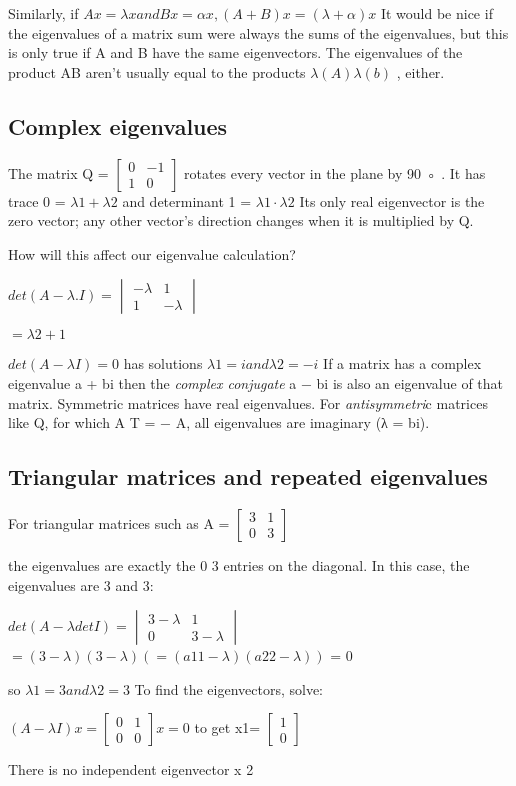 \documentclass{book}
\begin{document}
Similarly, if
$ Ax = \lambda x and Bx = αx, ( A + B ) x = ( \lambda + α ) x  $
It would be nice if the eigenvalues of a matrix sum were always the sums of the eigenvalues, but this is only true if A and B have the same eigenvectors. The eigenvalues of the product AB aren’t usually equal to the products
$ \lambda ( A ) \lambda ( b ) $ , either.

\subsection*{Complex eigenvalues}
The matrix Q =
$\begin{bmatrix} 
  0 & -1\\                
  1 & 0                 
 \end{bmatrix}$            
rotates every vector in the plane by 90 ◦ . It has trace 0 =
$ \lambda 1 + \lambda 2 $
and determinant 1 = 
$ \lambda 1 · \lambda 2 $
Its only real eigenvector is the zero vector; any other vector’s direction changes when it is multiplied by Q.

How will this affect our eigenvalue calculation?

$ det ( A − \lambda . I ) =
  \begin{vmatrix}
   − \lambda & 1\\
          1  & − \lambda
  \end{vmatrix}$

$ = \lambda 2 + 1 $

$ det ( A − λI ) = 0 $ 
has solutions 
$ λ 1 = i and λ 2 = − i $ 
If a matrix has a complex eigenvalue a + bi then the \emph{complex conjugate} a − bi is also an eigenvalue of that matrix.
Symmetric matrices have real eigenvalues.
For \emph{antisymmetri}c matrices like Q, for which A T = − A, all eigenvalues are imaginary (λ = bi).

\subsection*{Triangular matrices and repeated eigenvalues}

 For triangular matrices such as A = 
$\begin{bmatrix}
   3  & 1 \\
   0 & 3
  \end{bmatrix}$

the eigenvalues are exactly the 0 3  entries on the diagonal. In this case, the eigenvalues are 3 and 3:

$ det ( A − λ det I )=
\begin{vmatrix}
 3-\lambda & 1\\
   0       & 3-\lambda
\end{vmatrix}$
$ = ( 3 − \lambda )( 3 − \lambda )( = ( a 11 − \lambda )( a 22 − \lambda )) $
  = 0

so
$ \lambda 1 = 3 and \lambda 2 = 3 $
To find the eigenvectors, solve:

$ ( A − λI ) x = 
\begin{bmatrix}
 0 & 1\\
 0 & 0
\end{bmatrix}
x = 0 $ 
to get x1=
$ \begin{bmatrix}
   1\\
   0
\end{bmatrix} $

There is no independent eigenvector x 2
\end{document}

